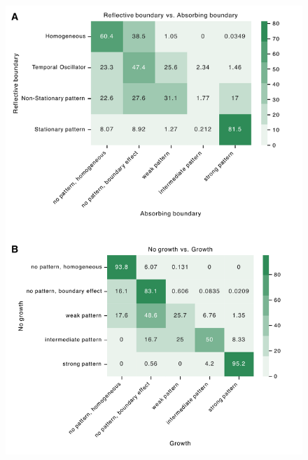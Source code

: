 \begin{figure}[!h]
    \includegraphics[width=1\textwidth]{figures/sup_confusion_matrix}

    \caption{\textbf{}}

    \label{sup_fig5}
\end{figure}
